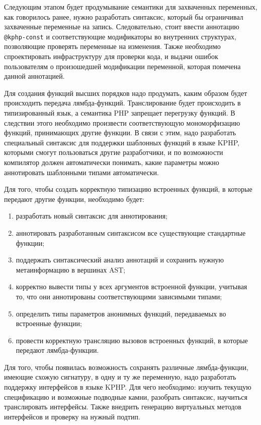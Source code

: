 Следующим этапом будет продумывание семантики для захваченных переменных, как говорилось ранее, нужно разработать синтаксис, который бы ограничивал захваченные переменные на запись.
Следовательно, стоит ввести аннотацию \verb|@kphp-const| и соответствующие модификаторы во внутренних структурах, позволяющие проверять переменные на изменения.
Также необходимо спроектировать инфраструктуру для проверки кода, и выдачи ошибок пользователям о произошедшей модификации переменной, которая помечена данной аннотацией.

Для создания функций высших порядков надо продумать, каким образом будет происходить передача лямбда-функций.
Транслирование будет происходить в типизированный язык, а семантика PHP запрещает перегрузку функций.
В следствии этого необходимо произвести соответствующую мономорфизацию функций, принимающих другие функции.
В связи с этим, надо разработать специальный синтаксис для поддержки шаблонных функций в языке KPHP, которыми смогут пользоваться другие разработчики, и по возможности компилятор должен автоматически понимать, какие параметры можно аннотировать шаблонными типами автоматически.

Для того, чтобы создать корректную типизацию встроенных функций, в которые передают другие функции, необходимо будет:
\begin{enumerate}
  \item разработать новый синтаксис для аннотирования;
  \item аннотировать разработанным синтаксисом все существующие стандартные функции;
  \item поддержать синтаксический анализ аннотаций и сохранить нужную метаинформацию в вершинах AST;
  \item корректно вывести типы у всех аргументов встроенной функции, учитывая то, что они аннотированы соответствующими зависимыми типами;
  \item определить типы параметров анонимных функций, передаваемых во встроенные функции;
  \item провести корректную трансляцию вызовов встроенных функций, в которые передают лямбда-функции.
\end{enumerate}

Для того, чтобы появилась возможность сохранять различные лямбда-функции, имеющие схожую сигнатуру, в одну и ту же переменную, надо разработать поддержку интерфейсов в языке KPHP.
Для чего необходимо: изучить текущую спецификацию и возможные подводные камни, разобрать синтаксис, научиться транслировать интерфейсы.
Также внедрить генерацию виртуальных методов интерфейсов и проверку на нужный подтип.

